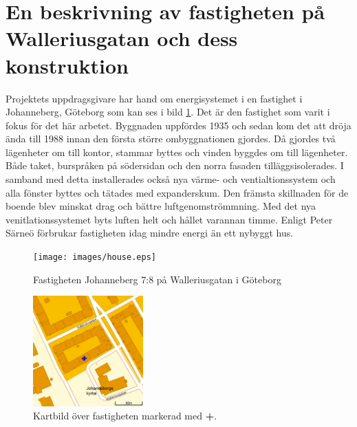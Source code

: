 \section{En beskrivning av fastigheten på Walleriusgatan och dess konstruktion}
\label{subsec:thehouse}




Projektets uppdragsgivare har hand om energisystemet i en fastighet i Johanneberg, Göteborg som kan ses i bild \ref{fig:thehouse:house}.
Det är den fastighet som varit i fokus för det här arbetet. Byggnaden uppfördes 1935\cite{ritningar_urspr} och sedan kom det att dröja ända till 1988 innan den första större ombyggnationen gjordes. Då gjordes två lägenheter om till kontor, stammar byttes och vinden byggdes om till lägenheter. Både taket, burspråken på södersidan och den norra fasaden tilläggsisolerades. I samband med detta installerades också nya värme- och ventialtionssystem och alla fönster byttes och tätades med expanderskum. Den främsta skillnaden för de boende blev minskat drag och bättre luftgenomströmmning.  Med det nya venitlationssystemet byts luften helt och hållet varannan timme. Enligt Peter Särneö\cite{petersarneo} förbrukar fastigheten idag mindre energi än ett nybyggt hus.

\begin{figure}
\centering
\texttt{[image: images/house.eps]}
\caption{Fastigheten Johanneberg 7:8 på Walleriusgatan i Göteborg}
\label{fig:thehouse:house}
\end{figure}

\begin{figure}
\centering
\includegraphics[width=1.67in,height=1.67in]{images/map.eps}
\caption{Kartbild över fastigheten markerad med \textbf{\color{blue}+}.}
\end{figure}

